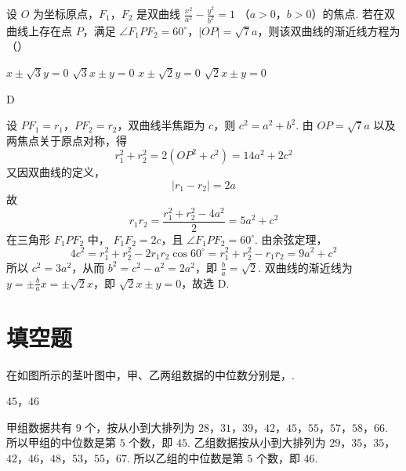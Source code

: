 \begin{problem}
设 \(O\) 为坐标原点，\(F_1\)，\(F_2\) 是双曲线 \(\frac{x^{2}}{a^{2}} - \frac{y^{2}}{b^{2}} = 1\) （\(a > 0\)，\(b > 0\)）的焦点. 若在双曲线上存在点 \(P\)，满足 \(\angle F_1PF_2 = 60^{\circ}\)，\(|OP| = \sqrt{7}a\)，则该双曲线的渐近线方程为（\quad）

\choices
    {\(x \pm \sqrt{3} y = 0\)}
    {\(\sqrt{3} x \pm y = 0\)}
    {\(x \pm \sqrt{2} y = 0\)}
    {\(\sqrt{2} x \pm y = 0\)}

\begin{answer}
D
\end{answer}

\begin{solution}
设 \(PF_1=r_1\)，\(PF_2=r_2\)，双曲线半焦距为 \(c\)，则
\(c^2=a^2+b^2\). 由
\(OP=\sqrt7a\) 以及两焦点关于原点对称，得
\[
r_1^2+r_2^2=2(OP^2+c^2)=14a^2+2c^2
\]
又因双曲线的定义，
\[
|r_1-r_2|=2a
\]
故
\[
r_1r_2=\frac{r_1^2+r_2^2-4a^2}{2}=5a^2+c^2
\]
在三角形 \(F_1PF_2\) 中，
\(F_1F_2=2c\)，且 \(\angle F_1PF_2=60^{\circ}\). 由余弦定理，
\[
4c^2=r_1^2+r_2^2-2r_1r_2\cos60^{\circ}
=r_1^2+r_2^2-r_1r_2
=9a^2+c^2
\]
所以 \(c^2=3a^2\)，从而 \(b^2=c^2-a^2=2a^2\)，即
\(\frac ba=\sqrt2\). 双曲线的渐近线为
\(y=\pm\frac ba x=\pm\sqrt2x\)，即
\(\sqrt2x\pm y=0\)，故选 D.
\end{solution}
\end{problem}

\section{填空题}

\begin{problem}
在如图所示的茎叶图中，甲、乙两组数据的中位数分别是\fillinblank{}，\fillinblank{}.


\begin{answer}
\(45\)，\(46\)
\end{answer}

\begin{solution}
甲组数据共有 \(9\) 个，按从小到大排列为
\(28\)，\(31\)，\(39\)，\(42\)，\(45\)，\(55\)，\(57\)，\(58\)，\(66\).
所以甲组的中位数是第 \(5\) 个数，即 \(45\). 乙组数据按从小到大排列为
\(29\)，\(35\)，\(35\)，\(42\)，\(46\)，\(48\)，\(53\)，\(55\)，\(67\).
所以乙组的中位数是第 \(5\) 个数，即 \(46\).
\end{solution}
\end{problem}

